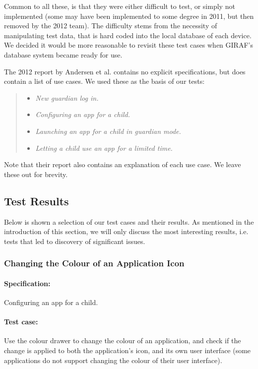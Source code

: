 Common to all these, is that they were either difficult to test, or simply not implemented (some may have been implemented to some degree in 2011, but then removed by the 2012 team). The difficulty stems from the necessity of manipulating test data, that is hard coded into the local database of each device. We decided it would be more reasonable to revisit these test cases when GIRAF's database system became ready for use.

The 2012 report by Andersen et al. \cite{launcher2012} contains no explicit specifications, but does contain a list of use cases. We used these as the basis of our tests:
\begin{quote}
\begin{itemize}
	\item \textit{New guardian log in.}
	\item \textit{Configuring an app for a child.}
	\item \textit{Launching an app for a child in guardian mode.}
	\item \textit{Letting a child use an app for a limited time.}
\end{itemize}
\end{quote}
Note that their report also contains an explanation of each use case. We leave these out for brevity.

\subsection{Test Results}
Below is shown a selection of our test cases and their results.
As mentioned in the introduction of this section, we will only discuss the most interesting results, i.e. tests that led to discovery of significant issues.

\subsubsection*{Changing the Colour of an Application Icon}
\paragraph{Specification:} Configuring an app for a child.
\paragraph{Test case:} Use the colour drawer to change the colour of an application, and check if the change is applied to both the application's icon, and its own user interface (some applications do not support changing the colour of their user interface).
